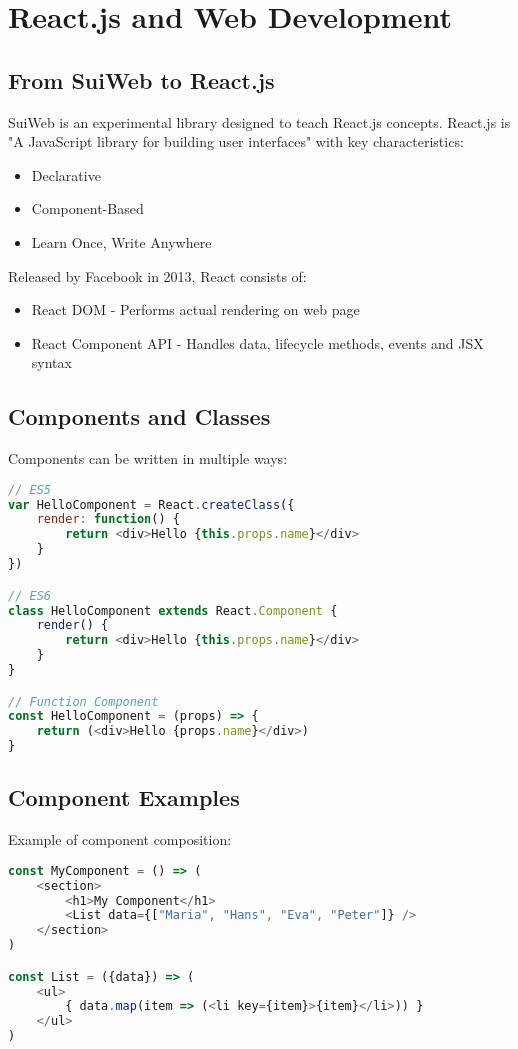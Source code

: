 \section{React.js and Web Development}

\subsection{From SuiWeb to React.js}
SuiWeb is an experimental library designed to teach React.js concepts. React.js is "A JavaScript library for building user interfaces" with key characteristics:
\begin{itemize}
    \item Declarative
    \item Component-Based
    \item Learn Once, Write Anywhere
\end{itemize}

Released by Facebook in 2013, React consists of:
\begin{itemize}
    \item React DOM - Performs actual rendering on web page
    \item React Component API - Handles data, lifecycle methods, events and JSX syntax
\end{itemize}

\subsection{Components and Classes}
Components can be written in multiple ways:

\begin{lstlisting}[language=JavaScript]
// ES5
var HelloComponent = React.createClass({
    render: function() {
        return <div>Hello {this.props.name}</div>
    }
})

// ES6
class HelloComponent extends React.Component {
    render() {
        return <div>Hello {this.props.name}</div>
    }
}

// Function Component
const HelloComponent = (props) => {
    return (<div>Hello {props.name}</div>)
}
\end{lstlisting}

\subsection{Component Examples}
Example of component composition:
\begin{lstlisting}[language=JavaScript]
const MyComponent = () => (
    <section>
        <h1>My Component</h1>
        <List data={["Maria", "Hans", "Eva", "Peter"]} />
    </section>
)

const List = ({data}) => (
    <ul>
        { data.map(item => (<li key={item}>{item}</li>)) }
    </ul>
)
\end{lstlisting}

